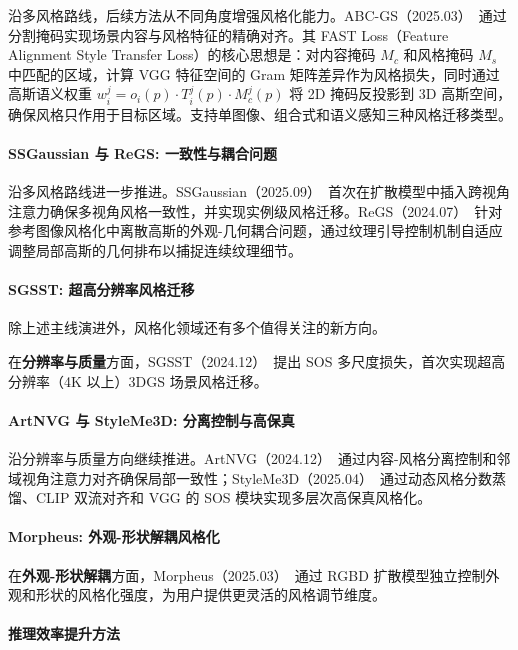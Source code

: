沿多风格路线，后续方法从不同角度增强风格化能力。ABC-GS（2025.03）~\cite{2503_22218}通过分割掩码实现场景内容与风格特征的精确对齐。其 FAST Loss（Feature Alignment Style Transfer Loss）的核心思想是：对内容掩码 $M_c$ 和风格掩码 $M_s$ 中匹配的区域，计算 VGG 特征空间的 Gram 矩阵差异作为风格损失，同时通过高斯语义权重 $w_i^j = o_i(p) \cdot T_i^j(p) \cdot M_c^j(p)$ 将 2D 掩码反投影到 3D 高斯空间，确保风格只作用于目标区域。支持单图像、组合式和语义感知三种风格迁移类型。

\paragraph{SSGaussian 与 ReGS: 一致性与耦合问题}

沿多风格路线进一步推进。SSGaussian（2025.09）~\cite{2509_04379}首次在扩散模型中插入跨视角注意力确保多视角风格一致性，并实现实例级风格迁移。ReGS（2024.07）~\cite{2407_07220}针对参考图像风格化中离散高斯的外观-几何耦合问题，通过纹理引导控制机制自适应调整局部高斯的几何排布以捕捉连续纹理细节。

\paragraph{SGSST: 超高分辨率风格迁移}

除上述主线演进外，风格化领域还有多个值得关注的新方向。

在\textbf{分辨率与质量}方面，SGSST（2024.12）~\cite{2412_03371}提出 SOS 多尺度损失，首次实现超高分辨率（4K 以上）3DGS 场景风格迁移。

\paragraph{ArtNVG 与 StyleMe3D: 分离控制与高保真}

沿分辨率与质量方向继续推进。ArtNVG（2024.12）~\cite{2412_18783}通过内容-风格分离控制和邻域视角注意力对齐确保局部一致性；StyleMe3D（2025.04）~\cite{2504_15281}通过动态风格分数蒸馏、CLIP 双流对齐和 VGG 的 SOS 模块实现多层次高保真风格化。

\paragraph{Morpheus: 外观-形状解耦风格化}

在\textbf{外观-形状解耦}方面，Morpheus（2025.03）~\cite{2503_02009}通过 RGBD 扩散模型独立控制外观和形状的风格化强度，为用户提供更灵活的风格调节维度。

\paragraph{推理效率提升方法}

